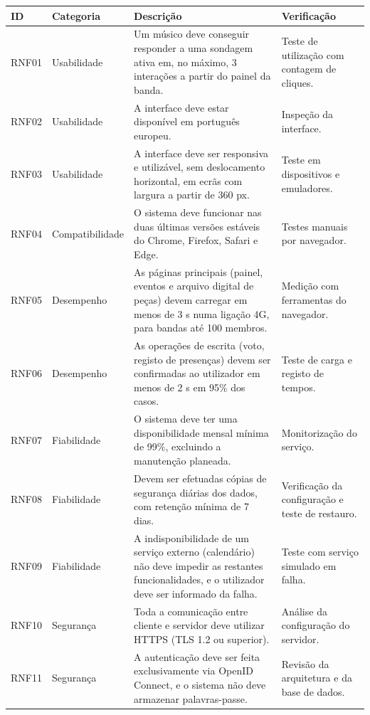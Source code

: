 \begin{longtable}{|p{1.5cm}|p{2.4cm}|p{6.4cm}|p{3.7cm}|}
\hline
\textbf{ID} & \textbf{Categoria} & \textbf{Descrição} & \textbf{Verificação} \\ \hline
\endhead
RNF01 & Usabilidade & Um músico deve conseguir responder a uma sondagem ativa em, no máximo, 3 interações a partir do painel da banda. & Teste de utilização com contagem de cliques. \\ \hline
RNF02 & Usabilidade & A interface deve estar disponível em português europeu. & Inspeção da interface. \\ \hline
RNF03 & Usabilidade & A interface deve ser responsiva e utilizável, sem deslocamento horizontal, em ecrãs com largura a partir de 360 px. & Teste em dispositivos e emuladores. \\ \hline
RNF04 & Compatibilidade & O sistema deve funcionar nas duas últimas versões estáveis do Chrome, Firefox, Safari e Edge. & Testes manuais por navegador. \\ \hline
RNF05 & Desempenho & As páginas principais (painel, eventos e arquivo digital de peças) devem carregar em menos de 3 s numa ligação 4G, para bandas até 100 membros. & Medição com ferramentas do navegador. \\ \hline
RNF06 & Desempenho & As operações de escrita (voto, registo de presenças) devem ser confirmadas ao utilizador em menos de 2 s em 95\% dos casos. & Teste de carga e registo de tempos. \\ \hline
RNF07 & Fiabilidade & O sistema deve ter uma disponibilidade mensal mínima de 99\%, excluindo a manutenção planeada. & Monitorização do serviço. \\ \hline
RNF08 & Fiabilidade & Devem ser efetuadas cópias de segurança diárias dos dados, com retenção mínima de 7 dias. & Verificação da configuração e teste de restauro. \\ \hline
RNF09 & Fiabilidade & A indisponibilidade de um serviço externo (calendário) não deve impedir as restantes funcionalidades, e o utilizador deve ser informado da falha. & Teste com serviço simulado em falha. \\ \hline
RNF10 & Segurança & Toda a comunicação entre cliente e servidor deve utilizar HTTPS (TLS 1.2 ou superior). & Análise da configuração do servidor. \\ \hline
RNF11 & Segurança & A autenticação deve ser feita exclusivamente via OpenID Connect, e o sistema não deve armazenar palavras-passe. & Revisão da arquitetura e da base de dados. \\ \hline

\end{longtable}
